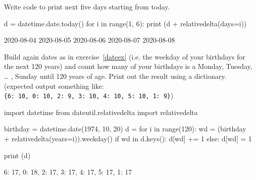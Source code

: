 \begin{question}
Write code to print next five days starting from today.
\end{question}

\begin{solution}
\end{solution}

\begin{ipython}
d = datetime.date.today()
for i in range(1, 6):
     print (d + relativedelta(days=i))

2020-08-04
2020-08-05
2020-08-06
2020-08-07
2020-08-08
\end{ipython}

\begin{question}
Build again dates as in exercise~\ref{dateex} (i.e. the weekday of your birthdays for the next 120 years) and count how many of your birthdays is a Monday, Tuesday, \ldots{} , Sunday until 120 years of age. Print out the result using a dictionary. (expected output something like: \texttt{\{6:\ 10,\ 0:\ 10,\ 2:\ 9,\ 3:\ 10,\ 4:\ 10,\ 5:\ 10,\ 1:\ 9\}})
\end{question}

\begin{solution}
\end{solution}

\begin{ipython}
import datetime
from dateutil.relativedelta import relativedelta

birthday = datetime.date(1974, 10, 20)
d = {}
for i in range(120):
    wd = (birthday + relativedelta(years=i)).weekday() 
    if wd in d.keys():
        d[wd] += 1
    else:
        d[wd] = 1
        
print (d)

{6: 17, 0: 18, 2: 17, 3: 17, 4: 17, 5: 17, 1: 17}
\end{ipython}

